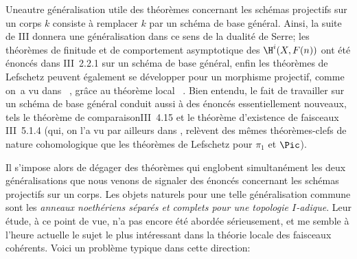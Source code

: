 Une\pageoriginale autre g\'en\'eralisation utile des th\'eor\`emes concernant les sch\'emas projectifs sur un corps $k$ consiste \`a remplacer $k$ par un sch\'ema de base g\'en\'eral. Ainsi, la suite de {\EGA III} donnera une g\'en\'eralisation dans ce sens de la dualit\'e de Serre; les th\'eor\`emes de finitude et de comportement asymptotique des $\H^i(X, F(n))$ ont \'et\'e \'enonc\'es dans \EGA III~2.2.1 sur un sch\'ema de base g\'en\'eral, enfin les th\'eor\`emes de Lefschetz peuvent \'egalement se d\'evelopper pour un morphisme projectif, comme on~a vu dans ~, gr\^ace au th\'eor\`eme local ~. Bien entendu, le fait de travailler sur un sch\'ema de base g\'en\'eral conduit aussi \`a des \'enonc\'es essentiellement nouveaux, tels le \og th\'eor\`eme de comparaison\fg \EGA III~4.15 et le th\'eor\`eme d'existence de faisceaux \EGA III~5.1.4 (qui, on l'a vu par ailleurs dans , rel\`event des m\^emes th\'eor\`emes-clefs de nature cohomologique que les th\'eor\`emes de Lefschetz pour $\pi_1$ et $\Pic$).

Il s'impose alors de d\'egager des th\'eor\`emes qui englobent simultan\'ement les deux g\'en\'eralisations que nous venons de signaler des \'enonc\'es concernant les sch\'emas projectifs sur un corps. Les objets naturels pour une telle g\'en\'eralisation commune sont les \emph{anneaux noeth\'eriens s\'epar\'es et complets pour une topologie $I$-adique}. Leur \'etude, \`a ce point de vue, n'a pas encore \'et\'e abord\'ee s\'erieusement, et me semble \`a l'heure actuelle le sujet le plus int\'eressant dans la th\'eorie locale des faisceaux coh\'erents. Voici un probl\`eme typique dans cette direction:

